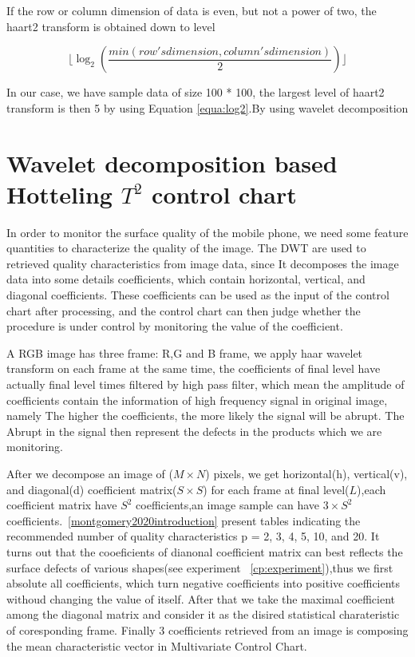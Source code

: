 If the row or column dimension of data is even, but not a power of two, the haart2 transform is obtained down to level 

\begin{equation}
\lfloor \log_2(\frac{min(row's dimension,column's dimension)}{2}) \rfloor \label{equa:log2}
\end{equation}

In our case, we have sample data of size 100 * 100, the largest level of haart2 transform is then 5 by using Equation \ref{equa:log2}.By using wavelet decomposition






\section{Wavelet decomposition based Hotteling $T^{2}$ control chart}
  In order to monitor the surface quality of the mobile phone, we need some feature quantities to characterize the quality of the image. The DWT are used to retrieved quality characteristics from image data, since It decomposes the image data into some details coefficients, which contain horizontal, vertical, and diagonal coefficients. These coefficients can be used as the input of the control chart after processing, and the control chart can then judge whether the procedure is under control by monitoring the value of the coefficient.


  A RGB image has three frame: R,G and B frame, we apply haar wavelet transform on each frame at the same time, the coefficients of final level have actually final level times filtered by high pass filter, which mean the amplitude of coefficients contain the information of high frequency signal in original image, namely The higher the coefficients, the more likely the signal will be abrupt. The Abrupt in the signal then represent the defects in the products which we are monitoring.


	After we decompose an image of ($M \times N$) pixels, we get horizontal(h), vertical(v), and diagonal(d) coefficient matrix($S \times S$) for each frame at final level($L$),each coefficient matrix have $S^2$ coefficients,an image sample can have $3 \times S^2$ coefficients.~\ref{montgomery2020introduction} present tables indicating the recommended number of quality characteristics p = 2, 3, 4, 5, 10, and 20. It turns out that the cooeficients of dianonal coefficient matrix can best reflects the surface defects of various shapes(see experiment ~\ref{cp:experiment}),thus we first absolute all coefficients, which turn negative coefficients into positive coefficients withoud changing the value of itself. After that we take the maximal coefficient among the diagonal matrix and consider it as the disired statistical charateristic of coresponding frame. Finally 3 coefficients retrieved from an image is composing the mean characteristic vector in Multivariate Control Chart. 


